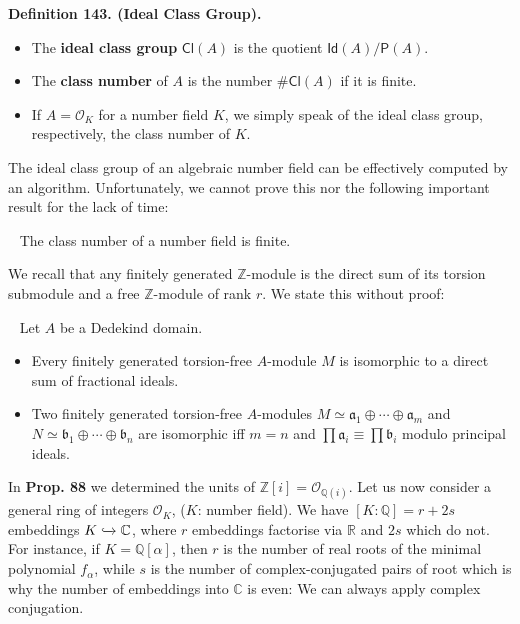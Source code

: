 \documentclass[12pt,a4paper,footinclude=true,headinclude=true]{scrbook} %
\newenvironment{theorem}[2][]
{\renewcommand\theinnercustomthm{#2}\innercustomthm[#1]
\begin{mdframed}[backgroundcolor=yellow!20]\ }
{\end{mdframed}\endinnercustomthm}
\newenvironment{definition}[2][Definition]
    { \begin{mdframed}[backgroundcolor=gray!20] \textbf{#1 #2.}\ }
    {  \end{mdframed}}
\begin{document}
\begin{definition}{143. (Ideal Class Group)}
    \begin{itemize}
        \item The \textbf{ideal class group} $\mathsf{Cl}(A)$ is the quotient $\mathsf{Id}(A)/\mathsf{P}(A)$.
        \item The \textbf{class number} of $A$ is the number $\# \mathsf{Cl}(A)$ if it is finite.
        \item If $A=\mathcal{O}_K$ for a number field $K$, we simply speak of the ideal class group, respectively, the class number of $K$.
    \end{itemize}
\end{definition}
\newpage
The ideal class group of an algebraic number field can be effectively computed by an algorithm. Unfortunately, we cannot prove this nor the following important result for the lack of time:
\begin{theorem}{144}
    The class number of a number field is finite.
\end{theorem}

We recall that any finitely generated $\mathbb{Z}$-module is the direct sum of its torsion submodule and a free $\mathbb{Z}$-module of rank $r$. We state this without proof:
\begin{theorem}{145}
    Let $A$ be a Dedekind domain.
    \begin{itemize}
        \item[(a)] Every finitely generated torsion-free $A$-module $M$ is isomorphic to a direct sum of fractional ideals.
        \item[(b)] Two finitely generated torsion-free $A$-modules $M\simeq\mathfrak{a}_1\oplus\cdots\oplus\mathfrak{a}_m$ and $N\simeq\mathfrak{b}_1\oplus\cdots\oplus\mathfrak{b}_n$ are isomorphic iff $m=n$ and $\prod\mathfrak{a}_i\equiv \prod\mathfrak{b}_i$ modulo principal ideals.
    \end{itemize}
\end{theorem}

In \textbf{Prop. 88} we determined the units of $\mathbb{Z}[i]=\mathcal{O}_{\mathbb{Q}(i)}$. Let us now consider a general ring of integers $\mathcal{O}_K$, ($K$: number field). We have $[K:\mathbb{Q}]=r+2s$ embeddings $K\xhookrightarrow{} \mathbb{C}$, where $r$ embeddings factorise via $\mathbb{R}$ and $2s$ which do not. For instance, if $K=\mathbb{Q}[\alpha]$, then $r$ is the number of real roots of the minimal polynomial $f_\alpha$, while $s$ is the number of complex-conjugated pairs of root which is why the number of embeddings into $\mathbb{C}$ is even: We can always apply complex conjugation.
\end{document}
